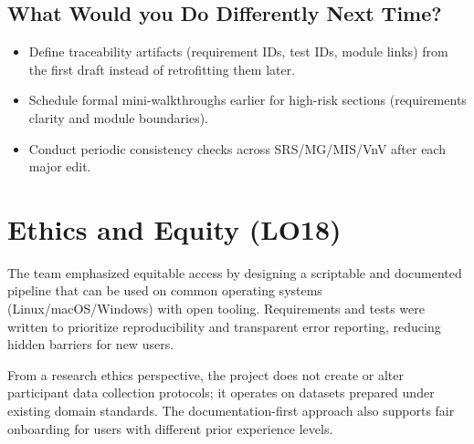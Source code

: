 \documentclass{article}
\begin{document}
\subsection{What Would you Do Differently Next Time?}

\begin{itemize}
  \item Define traceability artifacts (requirement IDs, test IDs, module links) from
  the first draft instead of retrofitting them later.
  \item Schedule formal mini-walkthroughs earlier for high-risk sections
  (requirements clarity and module boundaries).
  \item Conduct periodic consistency checks across SRS/MG/MIS/VnV after each major edit.
\end{itemize}

\section{Ethics and Equity (LO18)}

The team emphasized equitable access by designing a scriptable and documented
pipeline that can be used on common operating systems (Linux/macOS/Windows) with
open tooling. Requirements and tests were written to prioritize reproducibility and
transparent error reporting, reducing hidden barriers for new users.

From a research ethics perspective, the project does not create or alter participant
data collection protocols; it operates on datasets prepared under existing domain
standards. The documentation-first approach also supports fair onboarding for users
with different prior experience levels.
\end{document}
